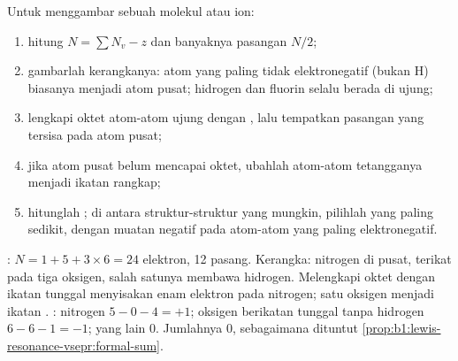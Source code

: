 \begin{method}\label{met:b1:lewis-resonance-vsepr:lewis}
Untuk menggambar  sebuah molekul atau ion:
\begin{enumerate}
  \item hitung  $N = \sum N_v - z$ dan banyaknya pasangan
        $N/2$;
  \item gambarlah kerangkanya: atom yang paling tidak elektronegatif
        (bukan H) biasanya menjadi atom pusat; hidrogen dan fluorin selalu
        berada di ujung;
  \item lengkapi oktet atom-atom ujung dengan ,
        lalu tempatkan pasangan yang tersisa pada atom pusat;
  \item jika atom pusat belum mencapai oktet, ubahlah  atom-atom tetangganya menjadi ikatan rangkap;
  \item hitunglah ; di antara struktur-struktur yang
        mungkin, pilihlah yang  paling sedikit, dengan
        muatan negatif pada atom-atom yang paling elektronegatif.
\end{enumerate}
\end{method}

\begin{example}\label{ex:b1:lewis-resonance-vsepr:hno3}
: $N = 1 + 5 + 3 \times 6 = 24$ elektron, 12 pasang. Kerangka:
nitrogen di pusat, terikat pada tiga oksigen, salah satunya membawa
hidrogen. Melengkapi oktet dengan ikatan tunggal menyisakan enam
elektron pada nitrogen; satu  oksigen menjadi
ikatan . : nitrogen $5 - 0 - 4 = +1$; oksigen
berikatan tunggal tanpa hidrogen $6 - 6 - 1 = -1$; yang lain 0.
Jumlahnya 0, sebagaimana dituntut
\cref{prop:b1:lewis-resonance-vsepr:formal-sum}.
\end{example}

